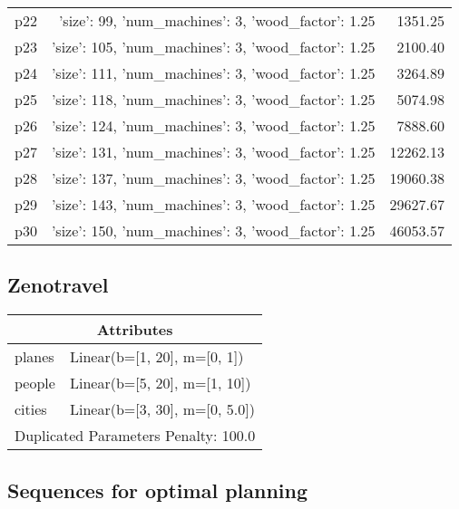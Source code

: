 \documentclass{article}
\begin{document}
\begin{center}
\begin{tabular}{@{}l|r|r@{}}
  p22&{'size': 99, 'num\_machines': 3, 'wood\_factor': 1.25}&1351.25\\
  p23&{'size': 105, 'num\_machines': 3, 'wood\_factor': 1.25}&2100.40\\
  p24&{'size': 111, 'num\_machines': 3, 'wood\_factor': 1.25}&3264.89\\
  p25&{'size': 118, 'num\_machines': 3, 'wood\_factor': 1.25}&5074.98\\
  p26&{'size': 124, 'num\_machines': 3, 'wood\_factor': 1.25}&7888.60\\
  p27&{'size': 131, 'num\_machines': 3, 'wood\_factor': 1.25}&12262.13\\
  p28&{'size': 137, 'num\_machines': 3, 'wood\_factor': 1.25}&19060.38\\
  p29&{'size': 143, 'num\_machines': 3, 'wood\_factor': 1.25}&29627.67\\
  p30&{'size': 150, 'num\_machines': 3, 'wood\_factor': 1.25}&46053.57
                            \end{tabular}
                            \end{center}
                    
                            \newpage \subsection{Zenotravel}
                    \begin{center}
                    \begin{tabular}{@{}p{}p{}@{}}
                    \multicolumn{2}{c}{\bf \large Attributes}\\\midrule
                    planes & Linear(b=[1, 20], m=[0, 1])\\
people & Linear(b=[5, 20], m=[1, 10])\\
cities & Linear(b=[3, 30], m=[0, 5.0]) \\\midrule
                    \multicolumn{2}{l}{Duplicated Parameters Penalty: 100.0}
                    \end{tabular}
                    \end{center}
                
                            \subsection*{Sequences for optimal planning}
\end{document}
